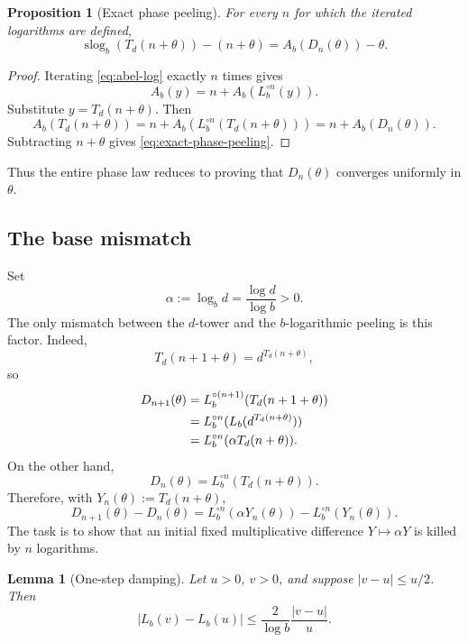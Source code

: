 \documentclass[11pt,a4paper]{article}
\theoremstyle{plain}
\newtheorem{proposition}[theorem]{Proposition}
\newtheorem{lemma}[theorem]{Lemma}
\theoremstyle{definition}
\theoremstyle{remark}
\newcommand{\slog}{\operatorname{slog}}
\newcommand{\abs}[1]{\left\lvert #1\right\rvert}
\begin{document}
\begin{proposition}[Exact phase peeling]\label{prop:exact-phase-peeling}
For every $n$ for which the iterated logarithms are defined,
\begin{equation}\label{eq:exact-phase-peeling}
  \slog_b(T_d(n+\theta))-(n+\theta)=A_b(D_n(\theta))-\theta.
\end{equation}
\end{proposition}

\begin{proof}
Iterating \eqref{eq:abel-log} exactly $n$ times gives
\[
  A_b(y)=n+A_b(L_b^{\circ n}(y)).
\]
Substitute $y=T_d(n+\theta)$.  Then
\[
  A_b(T_d(n+\theta))=n+A_b(L_b^{\circ n}(T_d(n+\theta)))=n+A_b(D_n(\theta)).
\]
Subtracting $n+\theta$ gives \eqref{eq:exact-phase-peeling}.
\end{proof}

Thus the entire phase law reduces to proving that $D_n(\theta)$ converges uniformly in $\theta$.

\subsection{The base mismatch}

Set
\begin{equation}\label{eq:alpha}
  \alpha:=\log_b d=\frac{\log d}{\log b}>0.
\end{equation}
The only mismatch between the $d$-tower and the $b$-logarithmic peeling is this factor.  Indeed,
\[
  T_d(n+1+\theta)=d^{T_d(n+\theta)},
\]
so
\begin{align}
  D_{n+1}(\theta)
  &=L_b^{\circ(n+1)}(T_d(n+1+\theta))\notag\\
  &=L_b^{\circ n}(L_b(d^{T_d(n+\theta)}))\notag\\
  &=L_b^{\circ n}(\alpha T_d(n+\theta)).\label{eq:Dnplus-alpha}
\end{align}
On the other hand,
\[
  D_n(\theta)=L_b^{\circ n}(T_d(n+\theta)).
\]
Therefore, with $Y_n(\theta):=T_d(n+\theta)$,
\begin{equation}\label{eq:dn-diff-alpha}
  D_{n+1}(\theta)-D_n(\theta)=L_b^{\circ n}(\alpha Y_n(\theta))-L_b^{\circ n}(Y_n(\theta)).
\end{equation}
The task is to show that an initial fixed multiplicative difference $Y\mapsto\alpha Y$ is killed by $n$ logarithms.

\begin{lemma}[One-step damping]\label{lem:one-step}
Let $u>0$, $v>0$, and suppose $\abs{v-u}\leq u/2$.  Then
\begin{equation}\label{eq:one-step-damping}
  \abs{L_b(v)-L_b(u)}\leq \frac{2}{\log b}\frac{\abs{v-u}}{u}.
\end{equation}
\end{lemma}
\end{document}
